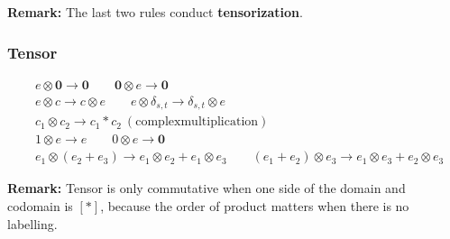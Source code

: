 \textbf{Remark: } The last two rules conduct \textbf{tensorization}.


\subsubsection*{Tensor}
\begin{align*}
  & e \otimes \textbf{0} \to \textbf{0}
  \qquad \textbf{0} \otimes e \to \textbf{0} \\
  & e \otimes c \to c \otimes e
  \qquad e \otimes \delta_{s, t} \to \delta_{s, t} \otimes e \\
  & c_1 \otimes c_2 \to c_1 * c_2\ \mathrm{(complex multiplication)}\\
  & 1 \otimes e \to e \qquad 0 \otimes e \to \mathbf{0} \\
  & e_1 \otimes (e_2 + e_3) \to e_1 \otimes e_2 + e_1 \otimes e_3
  \qquad 
  (e_1 + e_2) \otimes e_3 \to e_1 \otimes e_3 + e_2 \otimes e_3
\end{align*}

\textbf{Remark: } Tensor is only commutative when one side of the domain and codomain is $[*]$, because the order of product matters when there is no labelling.



